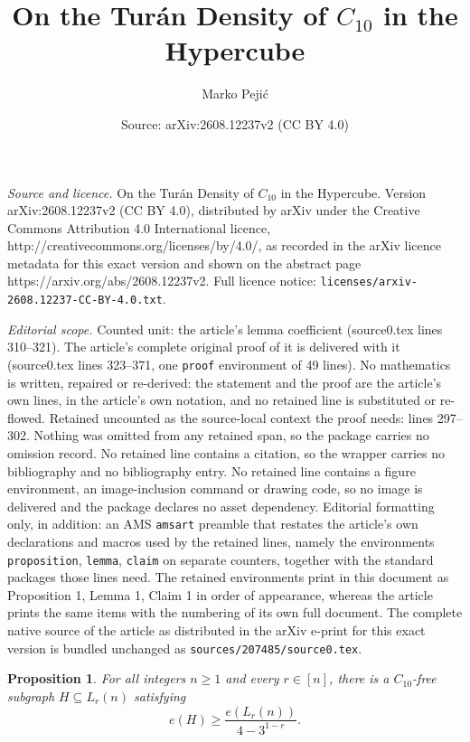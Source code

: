 \documentclass[10pt,a4paper]{amsart}
\title{On the Tur\'an Density of $C_{10}$ in the Hypercube}
\author{Marko Peji\'c}
\date{Source: arXiv:2608.12237v2 (CC BY 4.0)}
\newtheorem{proposition}{Proposition}
\begin{document}
\maketitle

\noindent\emph{Source and licence.} On the Tur\'an Density of $C_{10}$ in the Hypercube. Version arXiv:2608.12237v2 (CC BY 4.0), distributed by arXiv under the Creative Commons Attribution 4.0 International licence, http://creativecommons.org/licenses/by/4.0/, as recorded in the arXiv licence metadata for this exact version and shown on the abstract page https://arxiv.org/abs/2608.12237v2. Full licence notice: \texttt{licenses/arxiv-2608.12237-CC-BY-4.0.txt}.\par\smallskip

\noindent\textit{Editorial scope.} Counted unit: the article's lemma coefficient (source0.tex lines 310--321). The article's complete original proof of it is delivered with it (source0.tex lines 323--371, one \texttt{proof} environment of 49 lines). No mathematics is written, repaired or re-derived: the statement and the proof are the article's own lines, in the article's own notation, and no retained line is substituted or re-flowed.  Retained uncounted as the source-local context the proof needs: lines 297--302.  Nothing was omitted from any retained span, so the package carries no omission record.  No retained line contains a citation, so the wrapper carries no bibliography and no bibliography entry.  No retained line contains a figure environment, an image-inclusion command or drawing code, so no image is delivered and the package declares no asset dependency.  Editorial formatting only, in addition: an AMS \texttt{amsart} preamble that restates the article's own declarations and macros used by the retained lines, namely the environments \texttt{proposition}, \texttt{lemma}, \texttt{claim} on separate counters, together with the standard packages those lines need.  The retained environments print in this document as Proposition 1, Lemma 1, Claim 1 in order of appearance, whereas the article prints the same items with the numbering of its own full document.  The complete native source of the article as distributed in the arXiv e-print for this exact version is bundled unchanged as \texttt{sources/207485/source0.tex}.
\begin{proposition}\label{proposition: layer_lower}
For all integers $n \geq 1$ and every $r \in [n]$, there is a $C_{10}$-free subgraph $H \subseteq L_r(n)$ satisfying
\[
    e(H) \geq \frac{e(L_r(n))}{4-3^{1-r}}.
\]
\end{proposition}
\end{document}
